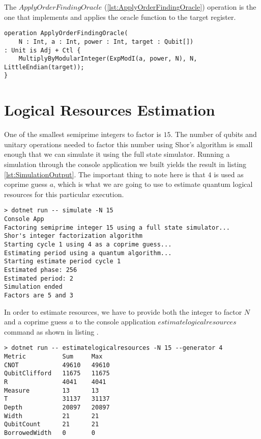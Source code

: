 The $ApplyOrderFindingOracle$ (\ref{lst:ApplyOrderFindingOracle}) operation is the one that implements and applies the oracle function to the target register.

\begin{lstlisting}[language=qsharp,label=lst:ApplyOrderFindingOracle,caption={Q\# implementation of the ApplyOrderFindingOracle operation}]
operation ApplyOrderFindingOracle(
    N : Int, a : Int, power : Int, target : Qubit[])
: Unit is Adj + Ctl {
    MultiplyByModularInteger(ExpModI(a, power, N), N, LittleEndian(target));
}
\end{lstlisting}

\section{Logical Resources Estimation}

One of the smallest semiprime integers to factor is $15$. The number of qubits and unitary operations needed to factor this number using Shor's algorithm is small enough that we can simulate it using the full state simulator. Running a simulation through the console application we built yields the result in listing \ref{lst:SimulationOutput}. The important thing to note here is that $4$ is used as coprime guess $a$, which is what we are going to use to estimate quantum logical resources for this particular execution.
\begin{lstlisting}[label=lst:SimulationOutput,caption={Output of simulating Shor's algorithm on a full-state simulator}]
> dotnet run -- simulate -N 15
Console App
Factoring semiprime integer 15 using a full state simulator...
Shor's integer factorization algorithm
Starting cycle 1 using 4 as a coprime guess...
Estimating period using a quantum algorithm...
Starting estimate period cycle 1
Estimated phase: 256
Estimated period: 2
Simulation ended
Factors are 5 and 3
\end{lstlisting}

In order to estimate resources, we have to provide both the integer to factor $N$ and a coprime guess $a$ to the console application $estimatelogicalresources$ command as shown in listing .
\begin{lstlisting}[label=lst:EstimateLogicalResourcesOutput,caption={Output of estimating logical resources for Shor's algorithm}]
> dotnet run -- estimatelogicalresources -N 15 --generator 4
Metric          Sum     Max
CNOT            49610   49610
QubitClifford   11675   11675
R               4041    4041
Measure         13      13
T               31137   31137
Depth           20897   20897
Width           21      21
QubitCount      21      21
BorrowedWidth   0       0
\end{lstlisting}

